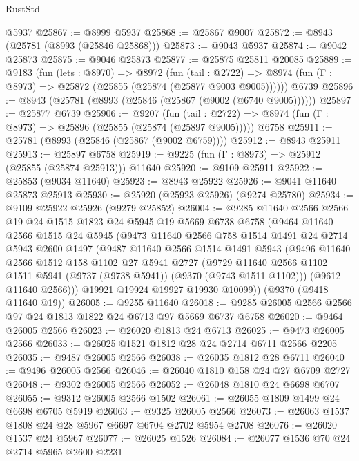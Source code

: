 \begin{lexlean}{RustStd}
\begin{coremodule}
{\begin{coremodule}
{{{{{{{{{{{{{{{{{{{{{{{{{{{{{{{{{{{{{{{    @5937
@25867 := @8999 @5937
@25868 := @25867 @9007
@25872 := @8943 (@25781 (@8993 (@25846 @25868)))
@25873 := @9043 @5937
@25874 := @9042 @25873
@25875 := @9046 @25873
@25877 := @25875 @25811 @20085
@25889 := @9183
    (fun (lets : @8970) =>
    @8972
      (fun (tail : @2722) =>
      @8974 (fun (Γ : @8973) => @25872 (@25855 (@25874 (@25877 @9003 @9005))))))
    @6739
@25896 := @8943 (@25781 (@8993 (@25846 (@25867 (@9002 (@6740 @9005))))))
@25897 := @25877 @6739
@25906 := @9207
    (fun (tail : @2722) => @8974 (fun (Γ : @8973) => @25896 (@25855 (@25874 (@25897 @9005)))))
    @6758
@25911 := @25781 (@8993 (@25846 (@25867 (@9002 @6759))))
@25912 := @8943 @25911
@25913 := @25897 @6758
@25919 := @9225 (fun (Γ : @8973) => @25912 (@25855 (@25874 @25913))) @11640
@25920 := @9109 @25911
@25922 := @25853 (@9034 @11640)
@25923 := @8943 @25922
@25926 := @9041 @11640 @25873 @25913
@25930 := @25920 (@25923 @25926) (@9274 @25780)
@25934 := @9109 @25922 @25926 (@9279 @25852)
@26004 := @9285
    @11640
    @2566
    @2566
    @19
    @24
    @1515
    @1823
    @24
    @5945
    @19
    @5669
    @6738
    @6758
    (@9464
      @11640
      @2566
      @1515
      @24
      @5945
      (@9473
        @11640
        @2566
        @758
        @1514
        @1491
        @24
        @2714
        @5943
        @2600
        @1497
        (@9487
          @11640
          @2566
          @1514
          @1491
          @5943
          (@9496
            @11640
            @2566
            @1512
            @158
            @1102
            @27
            @5941
            @2727
            (@9729 @11640 @2566 @1102 @1511 @5941 (@9737 (@9738 @5941)) (@9370 (@9743 @1511 @1102)))
            (@9612 @11640 @2566)))
        @19921
        @19924
        @19927
        @19930
        @10099))
    (@9370 (@9418 @11640 @19))
@26005 := @9255 @11640
@26018 := @9285 @26005 @2566 @2566 @97 @24 @1813 @1822 @24 @6713 @97 @5669 @6737 @6758
@26020 := @9464 @26005 @2566
@26023 := @26020 @1813 @24 @6713
@26025 := @9473 @26005 @2566
@26033 := @26025 @1521 @1812 @28 @24 @2714 @6711 @2566 @2205
@26035 := @9487 @26005 @2566
@26038 := @26035 @1812 @28 @6711
@26040 := @9496 @26005 @2566
@26046 := @26040 @1810 @158 @24 @27 @6709 @2727
@26048 := @9302 @26005 @2566
@26052 := @26048 @1810 @24 @6698 @6707
@26055 := @9312 @26005 @2566 @1502
@26061 := @26055 @1809 @1499 @24 @6698 @6705 @5919
@26063 := @9325 @26005 @2566
@26073 := @26063 @1537 @1808 @24 @28 @5967 @6697 @6704 @2702 @5954 @2708
@26076 := @26020 @1537 @24 @5967
@26077 := @26025 @1526
@26084 := @26077 @1536 @70 @24 @2714 @5965 @2600 @2231
}}}}}}}}}}}}}}}}}}}}}}}}}}}}}}}}}}}}}}}
\end{coremodule}}
\end{coremodule}
\end{lexlean}
